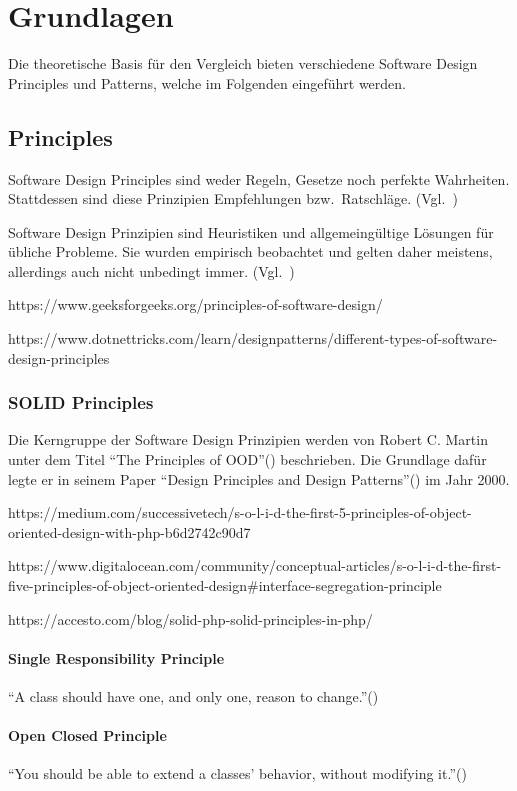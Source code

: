 \section{Grundlagen}
Die theoretische Basis für den Vergleich bieten verschiedene Software Design Principles und Patterns, welche
im Folgenden eingeführt werden.

\subsection{Principles}
Software Design Principles sind weder Regeln, Gesetze noch perfekte Wahrheiten.
Stattdessen sind diese Prinzipien Empfehlungen bzw.\ Ratschläge.
(Vgl.~\cite{getting-a-solid-start})

Software Design Prinzipien sind Heuristiken und allgemeingültige Lösungen für übliche Probleme.
Sie wurden empirisch beobachtet und gelten daher meistens, allerdings auch nicht unbedingt immer.
(Vgl.~\cite{getting-a-solid-start})

https://www.geeksforgeeks.org/principles-of-software-design/

https://www.dotnettricks.com/learn/designpatterns/different-types-of-software-design-principles

\subsubsection{SOLID Principles}
Die Kerngruppe der Software Design Prinzipien werden von Robert C. Martin unter dem Titel \enquote{The Principles of OOD}(\cite{solid}) beschrieben.
Die Grundlage dafür legte er in seinem Paper \enquote{Design Principles and Design Patterns}(\cite{design-principles-and-design-patterns}) im Jahr 2000.

https://medium.com/successivetech/s-o-l-i-d-the-first-5-principles-of-object-oriented-design-with-php-b6d2742c90d7

https://www.digitalocean.com/community/conceptual-articles/s-o-l-i-d-the-first-five-principles-of-object-oriented-design#interface-segregation-principle

https://accesto.com/blog/solid-php-solid-principles-in-php/

\paragraph{Single Responsibility Principle}
\enquote{A class should have one, and only one, reason to change.}(\cite{solid})

\paragraph{Open Closed Principle}
\enquote{You should be able to extend a classes' behavior, without modifying it.}(\cite{solid})

